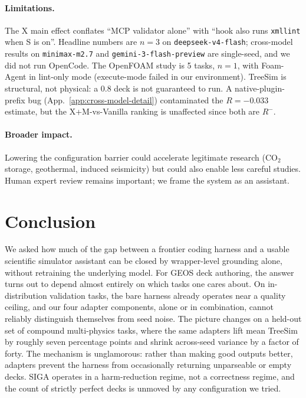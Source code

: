\documentclass{article}
\begin{document}
\paragraph{Limitations.} The $\mathrm{X}$ main effect conflates ``MCP validator alone'' with ``hook also runs \texttt{xmllint} when S is on''. Headline numbers are $n=3$ on \texttt{deepseek-v4-flash}; cross-model results on \texttt{minimax-m2.7} and \texttt{gemini-3-flash-preview} are single-seed, and we did not run OpenCode. The OpenFOAM study is 5 tasks, $n=1$, with Foam-Agent in lint-only mode (execute-mode failed in our environment). TreeSim is structural, not physical: a 0.8 deck is not guaranteed to run. A native-plugin-prefix bug (App.~\ref{app:cross-model-detail}) contaminated the $R=-0.033$ estimate, but the X+M-vs-Vanilla ranking is unaffected since both are $R^{-}$.

\paragraph{Broader impact.} Lowering the configuration barrier could accelerate legitimate research (CO$_2$ storage, geothermal, induced seismicity) but could also enable less careful studies. Human expert review remains important; we frame the system as an assistant.


\section{Conclusion}
\label{sec:conclusion}

We asked how much of the gap between a frontier coding harness and a usable scientific simulator assistant can be closed by wrapper-level grounding alone, without retraining the underlying model. For GEOS deck authoring, the answer turns out to depend almost entirely on which tasks one cares about. On in-distribution validation tasks, the bare harness already operates near a quality ceiling, and our four adapter components, alone or in combination, cannot reliably distinguish themselves from seed noise. The picture changes on a held-out set of compound multi-physics tasks, where the same adapters lift mean TreeSim by roughly seven percentage points and shrink across-seed variance by a factor of forty. The mechanism is unglamorous: rather than making good outputs better, adapters prevent the harness from occasionally returning unparseable or empty decks. SIGA operates in a harm-reduction regime, not a correctness regime, and the count of strictly perfect decks is unmoved by any configuration we tried.
\end{document}
